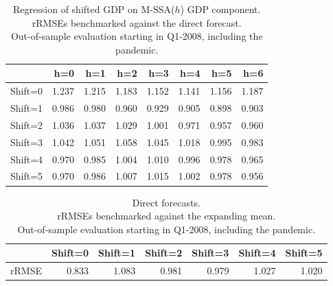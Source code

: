 \documentclass[11pt,a4paper]{article}
\begin{document}
\begin{table}[ht]
\centering
\begin{tabular}{rrrrrrrr}
  \hline
 & h=0 & h=1 & h=2 & h=3 & h=4 & h=5 & h=6 \\ 
  \hline
Shift=0 & 1.237 & 1.215 & 1.183 & 1.152 & 1.141 & 1.156 & 1.187 \\ 
  Shift=1 & 0.986 & 0.980 & 0.960 & 0.929 & 0.905 & 0.898 & 0.903 \\ 
  Shift=2 & 1.036 & 1.037 & 1.029 & 1.001 & 0.971 & 0.957 & 0.960 \\ 
  Shift=3 & 1.042 & 1.051 & 1.058 & 1.045 & 1.018 & 0.995 & 0.983 \\ 
  Shift=4 & 0.970 & 0.985 & 1.004 & 1.010 & 0.996 & 0.978 & 0.965 \\ 
  Shift=5 & 0.970 & 0.986 & 1.007 & 1.015 & 1.002 & 0.978 & 0.956 \\  
   \hline
\end{tabular}
\caption{Regression of shifted GDP on M-SSA($h$) GDP component.\\rRMSEs benchmarked against the direct forecast.\\Out-of-sample evaluation starting in Q1-2008, including the pandemic.} 
\label{rRMSE_mSSA_comp_direct3}
\end{table}%
\begin{table}[ht]
\centering
\begin{tabular}{rrrrrrr}
  \hline
 & Shift=0 & Shift=1 & Shift=2 & Shift=3 & Shift=4 & Shift=5 \\ 
  \hline
rRMSE & 0.833 & 1.083 & 0.981 & 0.979 & 1.027 & 1.020 \\ 
   \hline
\end{tabular}
\caption{Direct forecasts.\\
rRMSEs benchmarked against the expanding mean.\\Out-of-sample evaluation starting in Q1-2008, including the pandemic.} 
\label{rRMSE_mSSA_direct_mean4}
\end{table}
\end{document}
